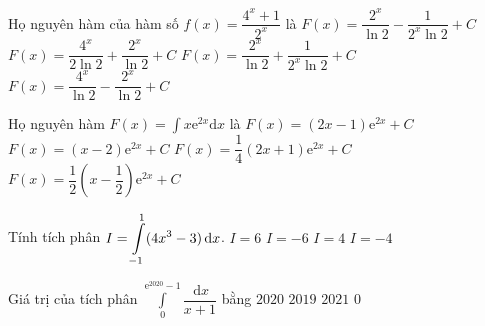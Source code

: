 \begin{ex}%
Họ nguyên hàm của hàm số $f(x)=\dfrac{4^x+1}{2^x}$ là
\choice
{\True $F(x)=\dfrac{2^x}{\ln 2}-\dfrac{1}{2^x\ln 2}+C$}
{$F(x)=\dfrac{4^x}{2\ln 2}+\dfrac{2^x}{\ln 2}+C$}
{$F(x)=\dfrac{2^x}{\ln 2}+\dfrac{1}{2^x\ln 2}+C$}
{$F(x)=\dfrac{4^x}{\ln 2}-\dfrac{2^x}{\ln 2}+C$}
\end{ex}

\begin{ex}%
Họ nguyên hàm $F(x)=\displaystyle\int x\mathrm{e}^{2x}\mathrm{d}x$ là
\choice
{$F(x)=(2x-1)\mathrm{e}^{2x}+C$}
{$F(x)=(x-2)\mathrm{e}^{2x}+C$}
{$F(x)=\dfrac{1}{4}(2x+1)\mathrm{e}^{2x}+C$}
{\True $F(x)=\dfrac{1}{2}\left(x-\dfrac{1}{2}\right)\mathrm{e}^{2x}+C$}
\end{ex}

\begin{ex}%
Tính tích phân $\displaystyle \displaystyle I=\int\limits_{-1}^1(4x^3-3)\mathrm{\,d}x$.
\choice
{$I=6$}
{\True $I=-6$}
{$I=4$}
{$I=-4$}
\end{ex}

\begin{ex}%
Giá trị của tích phân $\displaystyle\int\limits_{0}^{\mathrm{e}^{2020}-1} \dfrac{\mathrm{\,d}x}{x+1}$ bằng
\choice
{\True$2020$}
{$2019$}
{$2021$}
{$0$}
\end{ex}

